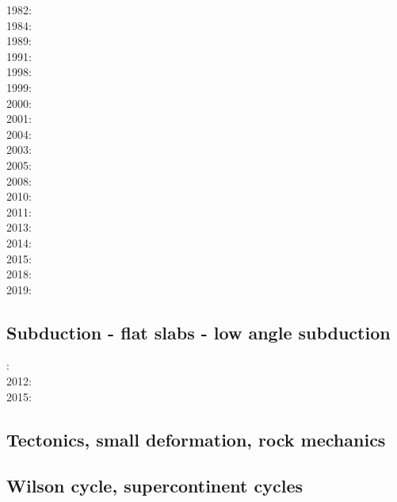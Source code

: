 1982: \cite{clwv82}\\
1984: \cite{cade84}\\
1989: \cite{clwv89}\\
1991: \cite{muph91}\\
1998: \cite{togu98}\\
1999: \cite{fagd99}\\
2000: \cite{pybf00}\\
2001: \cite{dohe01}\cite{reyb01}\cite{brry01}\\
2004: \cite{ster04}\cite{guhl04}\\
2003: \cite{hags03}\\
2005: \cite{bihi05}\\
2008: \cite{uegs08}\\
2010: \cite{nigm10}\cite{bucl10}\\
2011: \cite{bagw11}\\
2013: \cite{dyge13}\\
2014: \cite{recf14}\\
2015: \cite{matv15}\cite{pebu15}\cite{vapm15}\\
2018: \cite{zhlg18}\cite{basq18}\\
2019: \cite{begb19}\cite{gubg19}

\subsection*{Subduction - flat slabs - low angle subduction}

: \cite{cube11}\\
2012: \cite{mapm12}\\
2015: \cite{gehm15}

\subsection*{Tectonics, small deformation, rock mechanics}

\cite{ilma93}
\cite{hept96}
\cite{esfm08}
\cite{lega12}

\subsection*{Wilson cycle, supercontinent cycles}

\cite{trry95}
\cite{zhzl07}
\cite{zhzm09}
\cite{begb19}


